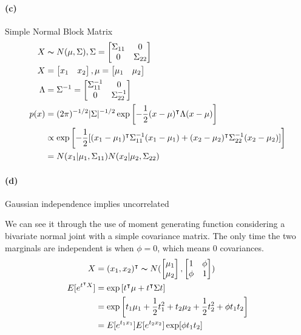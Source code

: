 \documentclass[11pt, letterpaper]{article}
\begin{document}
\paragraph{(c)} Simple Normal Block Matrix
\begin{align*}
    X &\thicksim N(\mu, \Sigma), \Sigma = \begin{bmatrix}\Sigma_{11} & 0 \\ 0 & \Sigma_{22}\end{bmatrix} \\
    X &= \begin{bmatrix}x_1 & x_2\end{bmatrix}, \mu = \begin{bmatrix}\mu_1 & \mu_2\end{bmatrix} \\
    \Lambda &= \Sigma^{-1} = \begin{bmatrix}\Sigma_{11}^{-1} & 0 \\ 0 & \Sigma_{22}^{-1}\end{bmatrix} \\
    p(x) &= (2\pi)^{-1/2} |\Sigma|^{-1/2} \exp\left[ -\frac{1}{2}(x-\mu)^{\intercal}\Lambda(x-\mu) \right] \\
        &\propto \exp\left[ -\frac{1}{2}[
            (x_1-\mu_1)^{\intercal}\Sigma_{11}^{-1}(x_1-\mu_1)
            + (x_2-\mu_2)^{\intercal}\Sigma_{22}^{-1}(x_2-\mu_2)
          ] \right] \\
        &= N(x_1|\mu_1, \Sigma_{11}) N(x_2|\mu_2, \Sigma_{22})
\end{align*}
\paragraph{(d)} Gaussian independence implies uncorrelated

We can see it through the use of moment generating function considering a bivariate normal joint with a simple covariance matrix. The only time the two marginals are independent is when $\phi = 0$, which means 0 covariances.
\begin{align*}
    X &= (x_1, x_2)^{\intercal} \thicksim N(\begin{bmatrix}\mu_1 \\ \mu_2\end{bmatrix}, \begin{bmatrix}1 & \phi \\ \phi & 1\end{bmatrix}) \\
    E[e^{t^{\intercal}X}] &= \exp\left[t^{\intercal}\mu + t^{\intercal}\Sigma t \right] \\
        &= \exp\left[ t_1\mu_1 + \frac{1}{2}t_1^2 + t_2\mu_2 + \frac{1}{2}t_2^2 + \phi t_1 t_2 \right] \\
        &= E[e^{t_1x_1}]E[e^{t_2x_2}]\exp[\phi t_1 t_2]
\end{align*}
\end{document}
